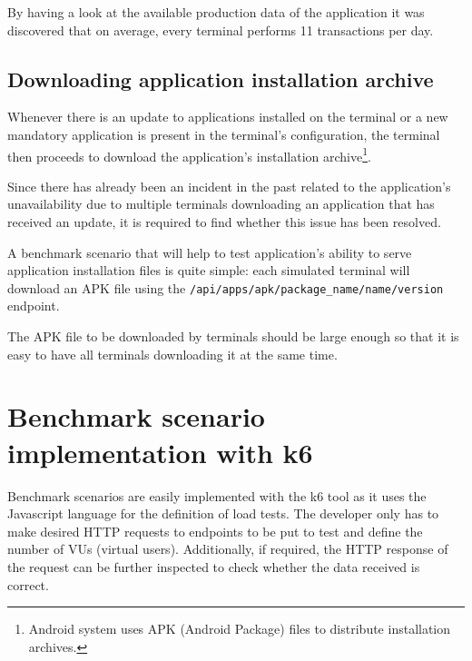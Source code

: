 \documentclass[12pt, a4paper]{article}
\let\oldsection\section
\renewcommand\section{\clearpage\oldsection}
\begin{document}
By having a look at the available production data of the application it was discovered that on average, every terminal performs 11 transactions per day.

\subsection{Downloading application installation archive}

Whenever there is an update to applications installed on the terminal or a new mandatory application is present in the terminal's configuration, the terminal then proceeds to download the application's installation archive\footnote{Android system uses APK (Android Package) files to distribute installation archives.}.

Since there has already been an incident in the past related to the application's unavailability due to multiple terminals downloading an application that has received an update, it is required to find whether this issue has been resolved. 

A benchmark scenario that will help to test application's ability to serve application installation files is quite simple: each simulated terminal will download an APK file using the \texttt{/api/apps/apk/{package\_name}/{name}/{version}} endpoint.

The APK file to be downloaded by terminals should be large enough so that it is easy to have all terminals downloading it at the same time.

\section{Benchmark scenario implementation with k6}

Benchmark scenarios are easily implemented with the k6 tool as it uses the Javascript language for the definition of load tests.
The developer only has to make desired HTTP requests to endpoints to be put to test and define the number of VUs (virtual users).
Additionally, if required, the HTTP response of the request can be further inspected to check whether the data received is correct.
\end{document}
